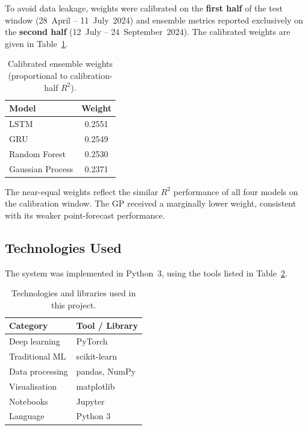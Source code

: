 \documentclass[12pt, a4paper]{article}
\begin{document}
To avoid data leakage, weights were calibrated on the \textbf{first half} of the test
window (28~April -- 11~July~2024) and ensemble metrics reported exclusively on the
\textbf{second half} (12~July -- 24~September~2024). The calibrated weights are given in
Table~\ref{tab:weights}.

\begin{table}[H]
    \centering
    \caption{Calibrated ensemble weights (proportional to calibration-half $R^{2}$).}
    \label{tab:weights}
    \renewcommand{\arraystretch}{1.2}
    \begin{tabular}{@{}lc@{}}
        \toprule
        \textbf{Model} & \textbf{Weight} \\
        \midrule
        LSTM             & 0.2551 \\
        GRU              & 0.2549 \\
        Random Forest    & 0.2530 \\
        Gaussian Process & 0.2371 \\
        \bottomrule
    \end{tabular}
\end{table}

The near-equal weights reflect the similar $R^{2}$ performance of all four models on the
calibration window. The GP received a marginally lower weight, consistent with its weaker
point-forecast performance.

\subsection{Technologies Used}
\label{subsec:technologies}

The system was implemented in Python~3, using the tools listed in
Table~\ref{tab:tech}.

\begin{table}[H]
    \centering
    \caption{Technologies and libraries used in this project.}
    \label{tab:tech}
    \renewcommand{\arraystretch}{1.2}
    \begin{tabular}{@{}ll@{}}
        \toprule
        \textbf{Category} & \textbf{Tool / Library} \\
        \midrule
        Deep learning     & PyTorch~\cite{paszke2019} \\
        Traditional ML    & scikit-learn~\cite{pedregosa2011} \\
        Data processing   & pandas, NumPy \\
        Visualisation     & matplotlib \\
        Notebooks         & Jupyter \\
        Language          & Python 3 \\
        \bottomrule
    \end{tabular}
\end{table}
\end{document}
